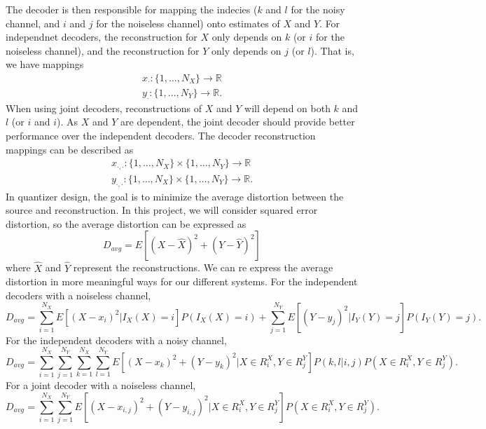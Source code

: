 \documentclass[10pt]{article}
\newcommand{\real}{\mathbb{R}}
\begin{document}
The decoder is then responsible for mapping the indecies ($k$ and $l$ for the noisy channel, and $i$ and $j$ for the noiseless channel) onto estimates of $X$ and $Y$. For independnet decoders, the reconstruction for $X$ only depends on $k$ (or $i$ for the noiseless channel), and the reconstruction for $Y$ only depends on $j$ (or $l$). That is, we have mappings
\begin{gather*}
    x_{\cdot} : \{1,\ldots,N_X\} \to \real \\
    y_{\cdot} : \{1,\ldots,N_Y\} \to \real.
\end{gather*}
When using joint decoders, reconstructions of $X$ and $Y$ will depend on both $k$ and $l$ (or $i$ and $i$). As $X$ and $Y$ are dependent, the joint decoder should provide better performance over the independent decoders. The decoder reconstruction mappings can be described as 
\begin{gather*}
    x_{\cdot,\cdot} : \{1,\ldots,N_X\} \times \{1,\ldots,N_Y\} \to \real \\
    y_{\cdot,\cdot} : \{1,\ldots,N_X\} \times \{1,\ldots,N_Y\} \to \real.
\end{gather*}
In quantizer design, the goal is to minimize the average distortion between the source and reconstruction. In this project, we will consider squared error distortion, so the average distortion can be expressed as
\begin{equation*}
    D_{avg} = E[{(X-\hat{X})}^2 + {(Y-\hat{Y})}^2]
\end{equation*}
where $\hat{X}$ and $\hat{Y}$ represent the reconstructions. We can re express the average distortion in more meaningful ways for our different systems. For the independent decoders with a noiseless channel,
\begin{equation}
    \label{eq:dist_indep_nonoise}
    D_{avg} = \sum_{i=1}^{N_X}E[{(X-x_i)}^2 | I_X(X) = i]P(I_X(X) = i) + \sum_{j=1}^{N_Y}E[{(Y-y_j)}^2 | I_Y(Y) = j]P(I_Y(Y) = j).
\end{equation}
For the independent decoders with a noisy channel,
\begin{equation}
    \label{eq:dist_indep_noise}
    D_{avg} = \sum_{i=1}^{N_X}\sum_{j=1}^{N_Y}\sum_{k=1}^{N_X}\sum_{l=1}^{N_Y} E[{(X-x_{k})}^2 +
    {(Y-y_{k})}^2 | X\in R_i^X, Y\in R_j^Y]P(k,l|i,j)P(X\in R_i^X, Y\in R_j^Y).
\end{equation}
For a joint decoder with a noiseless channel,
\begin{equation}
    \label{eq:dist_joint_nonoise}
    D_{avg} = \sum_{i=1}^{N_X}\sum_{j=1}^{N_Y} E[{(X-x_{i,j})}^2 + {(Y-y_{i,j})}^2 | X\in R_i^X, Y\in R_j^Y]P(X\in R_i^X, Y\in R_j^Y).
\end{equation}
\end{document}
